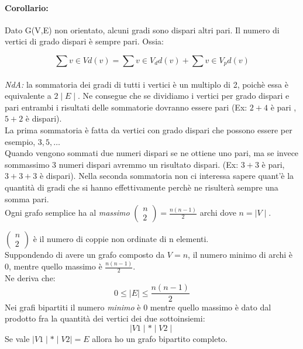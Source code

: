    \paragraph{Corollario:} Dato G(V,E) non orientato, alcuni gradi sono dispari altri pari. Il numero di vertici di grado dispari è sempre pari. Ossia:

    \begin{equation}
    \sum{v \in V} d(v) = \sum{v \in V_d} d(v) + \sum{v \in V_p} d(v)
    \end{equation} \\

    \noindent
    \textit{NdA:} la sommatoria dei gradi di tutti i vertici è un multiplo di 2, poichè essa è equivalente a \( 2 \mid E \mid\). Ne consegue che se dividiamo i vertici per grado dispari e pari entrambi i risultati delle sommatorie dovranno essere pari (Ex: $2 +4$ è pari , $5+2$ è dispari). \\
    La prima sommatoria è fatta da vertici con grado dispari che possono essere per esempio, $3,5, \dots$ \\ 
    Quando vengono sommati due numeri dispari se ne ottiene uno pari, ma se invece sommassimo 3 numeri dispari avremmo un risultato dispari. (Ex: $3+3$ è pari, $3+3+3$ è dispari). Nella seconda sommatoria non ci interessa sapere quant'è la quantità di gradi che si hanno effettivamente perchè ne risulterà sempre una somma pari.\\

    Ogni grafo semplice ha al \emph{massimo} \( \left( \begin{array}{c} n \\ 2 \end{array} \right) = \frac{n(n-1)}{2} \) archi dove \( n = \mid V \mid \). \par
    \( \left( \begin{array}{c} n \\ 2 \end{array} \right) \) è il numero di coppie non ordinate di n elementi. \\
    Suppondendo di avere un grafo composto da \(V = n\), il numero minimo di archi è 0, mentre quello massimo è $\frac{n(n-1)}{2}$.\\
    Ne deriva che:
    \begin{equation}
    0 \leq \mid E \mid \leq \frac{n(n-1)}{2}
    \end{equation}
    Nei grafi bipartiti il numero \emph{minimo} è 0 mentre quello massimo è dato dal prodotto fra la quantità dei vertici dei due sottoinsiemi:
    \begin{equation}
    \mid V1 \mid * \mid V2 \mid
    \end{equation}
    Se vale \( \mid V1 \mid * \mid V2 \mid =E \) allora ho un grafo bipartito completo.

